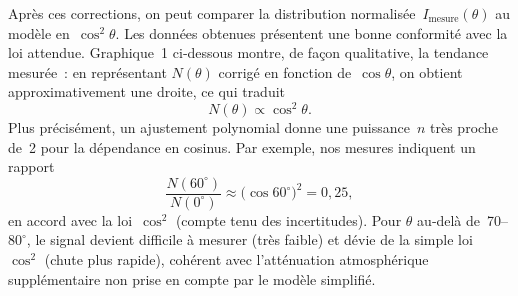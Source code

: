 \documentclass[a4paper,12pt,twoside]{article}
\begin{document}
Après ces corrections, on peut comparer la distribution normalisée~$I_{\mathrm{mesure}}(\theta)$ au modèle en~$\cos^{2}\theta$. Les données obtenues présentent une bonne conformité avec la loi attendue. Graphique~1 ci‑dessous montre, de façon qualitative, la tendance mesurée~: en représentant $N(\theta)$ corrigé en fonction de~$\cos\theta$, on obtient approximativement une droite, ce qui traduit
\[
N(\theta)\propto\cos^{2}\theta.
\]
Plus précisément, un ajustement polynomial donne une puissance~$n$ très proche de~2 pour la dépendance en cosinus. Par exemple, nos mesures indiquent un rapport
\[
\frac{N(60^\circ)}{N(0^\circ)} \approx \bigl(\cos 60^\circ\bigr)^2 = 0{,}25,
\]
en accord avec la loi~$\cos^2$ (compte tenu des incertitudes). Pour $\theta$ au‑delà de~70--$80^\circ$, le signal devient difficile à mesurer (très faible) et dévie de la simple loi~$\cos^2$ (chute plus rapide), cohérent avec l'atténuation atmosphérique supplémentaire non prise en compte par le modèle simplifié.
\end{document}
